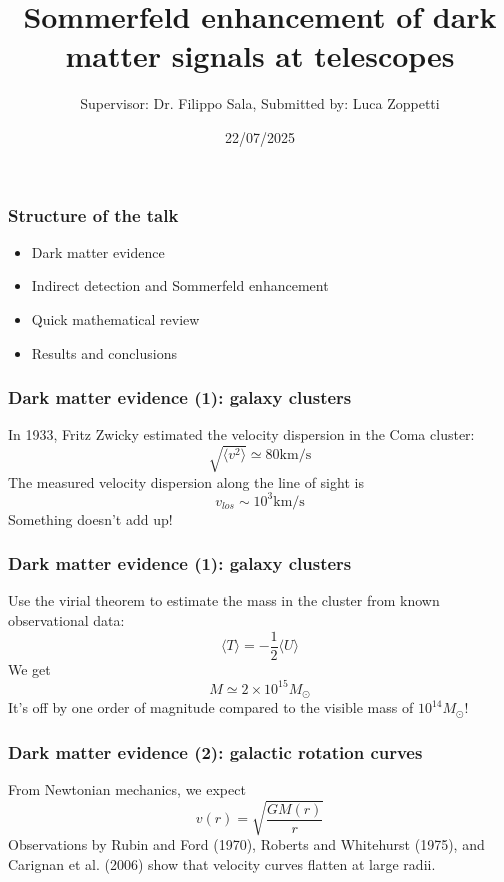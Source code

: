 \documentclass{beamer}
\title{Sommerfeld enhancement of dark matter signals at telescopes}
\author{Supervisor: Dr. Filippo Sala, Submitted by: Luca Zoppetti}
\institute{Alma Mater Studiorum - University of Bologna}
\date{22/07/2025}
\begin{document}
\frame{\titlepage}

\begin{frame}
\frametitle{Structure of the talk}
\begin{itemize}
	\item Dark matter evidence
	\item Indirect detection and Sommerfeld enhancement
	\item Quick mathematical review
	\item Results and conclusions
\end{itemize}
\end{frame}

\begin{frame}
\frametitle{Dark matter evidence (1): galaxy clusters}
In 1933, Fritz Zwicky estimated the velocity dispersion in the Coma cluster:
\[
	\sqrt{\langle v^2 \rangle } \simeq 80 \mathrm{km / s}
\]
\pause
The measured velocity dispersion along the line of sight is
\[
	v_{los} \sim 10^3 \mathrm{km / s} 
\]
\pause
Something doesn't add up!
\end{frame}

\begin{frame}
\frametitle{Dark matter evidence (1): galaxy clusters}
Use the virial theorem to estimate the mass in the cluster from known observational data:
\[
	\langle T \rangle = - \frac{1}{2} \langle U \rangle 
\]
\pause
We get
\[
	M \simeq 2 \times 10^{15} M_\odot
\]
\pause
It's off by one order of magnitude compared to the visible mass of \(10^{14} M_\odot\)!
\end{frame}

\begin{frame}
\frametitle{Dark matter evidence (2): galactic rotation curves}
From Newtonian mechanics, we expect
\[
	v(r) = \sqrt{\frac{GM(r)}{r}} 
\]
\pause
Observations by Rubin and Ford (1970), Roberts and Whitehurst (1975), and Carignan et al. (2006) show that velocity curves flatten at large radii.
\end{frame}
\end{document}
